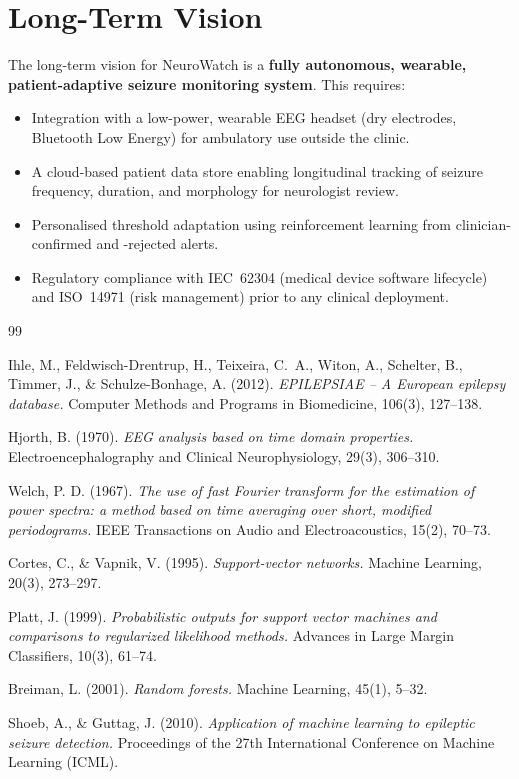 \documentclass[12pt, a4paper]{report}
\begin{document}
\section{Long-Term Vision}

The long-term vision for NeuroWatch is a \textbf{fully autonomous,
wearable, patient-adaptive seizure monitoring system}. This requires:

\begin{itemize}
  \item Integration with a low-power, wearable EEG headset (dry electrodes,
        Bluetooth Low Energy) for ambulatory use outside the clinic.
  \item A cloud-based patient data store enabling longitudinal tracking
        of seizure frequency, duration, and morphology for neurologist review.
  \item Personalised threshold adaptation using reinforcement learning
        from clinician-confirmed and -rejected alerts.
  \item Regulatory compliance with IEC~62304 (medical device software
        lifecycle) and ISO~14971 (risk management) prior to any clinical
        deployment.
\end{itemize}

\begin{thebibliography}{99}

Ihle, M., Feldwisch-Drentrup, H., Teixeira, C.~A., Witon, A., Schelter, B.,
Timmer, J., \& Schulze-Bonhage, A. (2012).
\textit{EPILEPSIAE -- A European epilepsy database.}
Computer Methods and Programs in Biomedicine, 106(3), 127--138.

Hjorth, B. (1970).
\textit{EEG analysis based on time domain properties.}
Electroencephalography and Clinical Neurophysiology, 29(3), 306--310.

Welch, P. D. (1967).
\textit{The use of fast Fourier transform for the estimation of power
spectra: a method based on time averaging over short, modified periodograms.}
IEEE Transactions on Audio and Electroacoustics, 15(2), 70--73.

Cortes, C., \& Vapnik, V. (1995).
\textit{Support-vector networks.}
Machine Learning, 20(3), 273--297.

Platt, J. (1999).
\textit{Probabilistic outputs for support vector machines and comparisons to
regularized likelihood methods.}
Advances in Large Margin Classifiers, 10(3), 61--74.

Breiman, L. (2001).
\textit{Random forests.}
Machine Learning, 45(1), 5--32.

Shoeb, A., \& Guttag, J. (2010).
\textit{Application of machine learning to epileptic seizure detection.}
Proceedings of the 27th International Conference on Machine Learning (ICML).

\end{thebibliography}
\end{document}
